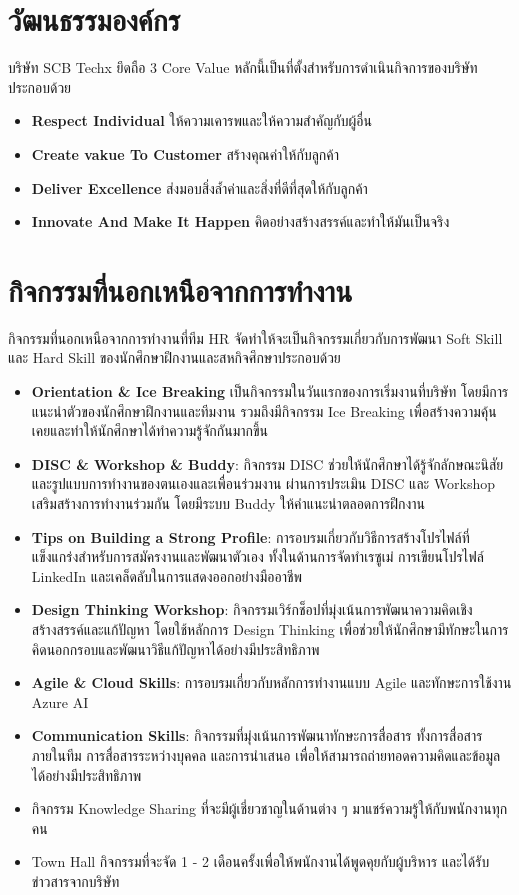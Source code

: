 \section{วัฒนธรรมองค์กร}
บริษัท SCB Techx ยึดถือ 3 Core Value หลักนี้เป็นที่ตั้งสำหรับการดำเนินกิจการของบริษัทประกอบด้วย
\begin{itemize}
      \item \textbf{Respect Individual} ให้ความเคารพและให้ความสำคัญกับผู้อื่น
      \item \textbf{Create vakue To Customer} สร้างคุณค่าให้กับลูกค้า
      \item \textbf{Deliver Excellence} ส่งมอบสิ่งล้ำค่าและสิ่งที่ดีที่สุดให้กับลูกค้า
      \item \textbf{Innovate And Make It Happen} คิดอย่างสร้างสรรค์และทำให้มันเป็นจริง
\end{itemize}

\clearpage

\section{กิจกรรมที่นอกเหนือจากการทำงาน}
กิจกรรมที่นอกเหนือจากการทำงานที่ทีม HR จัดทำให้จะเป็นกิจกรรมเกี่ยวกับการพัฒนา Soft Skill และ Hard Skill ของนักศึกษาฝึกงานและสหกิจศึกษาประกอบด้วย
\begin{itemize}
      \item \textbf{Orientation \& Ice Breaking} เป็นกิจกรรมในวันแรกของการเริ่มงานที่บริษัท โดยมีการแนะนำตัวของนักศึกษาฝึกงานและทีมงาน รวมถึงมีกิจกรรม Ice Breaking เพื่อสร้างความคุ้นเคยและทำให้นักศึกษาได้ทำความรู้จักกันมากขึ้น
      \item \textbf{DISC \& Workshop \& Buddy}: กิจกรรม DISC ช่วยให้นักศึกษาได้รู้จักลักษณะนิสัยและรูปแบบการทำงานของตนเองและเพื่อนร่วมงาน ผ่านการประเมิน DISC และ Workshop เสริมสร้างการทำงานร่วมกัน โดยมีระบบ Buddy ให้คำแนะนำตลอดการฝึกงาน
      \item \textbf{Tips on Building a Strong Profile}: การอบรมเกี่ยวกับวิธีการสร้างโปรไฟล์ที่แข็งแกร่งสำหรับการสมัครงานและพัฒนาตัวเอง ทั้งในด้านการจัดทำเรซูเม่ การเขียนโปรไฟล์ LinkedIn และเคล็ดลับในการแสดงออกอย่างมืออาชีพ
      \item \textbf{Design Thinking Workshop}: กิจกรรมเวิร์กช็อปที่มุ่งเน้นการพัฒนาความคิดเชิงสร้างสรรค์และแก้ปัญหา โดยใช้หลักการ Design Thinking เพื่อช่วยให้นักศึกษามีทักษะในการคิดนอกกรอบและพัฒนาวิธีแก้ปัญหาได้อย่างมีประสิทธิภาพ
      \item \textbf{Agile \& Cloud Skills}: การอบรมเกี่ยวกับหลักการทำงานแบบ Agile และทักษะการใช้งาน Azure AI
      \item \textbf{Communication Skills}: กิจกรรมที่มุ่งเน้นการพัฒนาทักษะการสื่อสาร ทั้งการสื่อสารภายในทีม การสื่อสารระหว่างบุคคล และการนำเสนอ เพื่อให้สามารถถ่ายทอดความคิดและข้อมูลได้อย่างมีประสิทธิภาพ
      \item กิจกรรม Knowledge Sharing ที่จะมีผู้เชี่ยวชาญในด้านต่าง ๆ มาแชร์ความรู้ให้กับพนักงานทุกคน
      \item Town Hall กิจกรรมที่จะจัด 1 - 2 เดือนครั้งเพื่อให้พนักงานได้พูดคุยกับผู้บริหาร และได้รับข่าวสารจากบริษัท
\end{itemize}